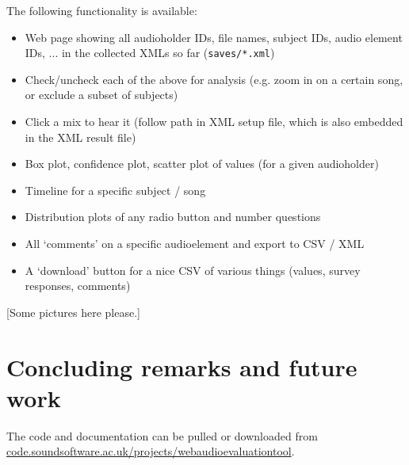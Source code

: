 \documentclass{sig-alternate}
\begin{document}
	The following functionality is available:
	
	\begin{itemize}[noitemsep,nolistsep]
		\item Web page showing all audioholder IDs, file names, subject IDs, audio element IDs, ... in the collected XMLs so far (\texttt{saves/*.xml})
		\item Check/uncheck each of the above for analysis (e.g. zoom in on a certain song, or exclude a subset of subjects)
		\item Click a mix to hear it (follow path in XML setup file, which is also embedded in the XML result file)
		\item Box plot, confidence plot, scatter plot of values (for a given audioholder)
		\item Timeline for a specific subject / song %
		\item Distribution plots of any radio button and number questions %
		\item All `comments' on a specific audioelement and export to CSV / XML
		\item A `download' button for a nice CSV of various things (values, survey responses, comments) %
	\end{itemize}

	
	[Some pictures here please.]

\section{Concluding remarks and future work}
	
	The code and documentation can be pulled or downloaded from \url{code.soundsoftware.ac.uk/projects/webaudioevaluationtool}. 
	
\end{document}
